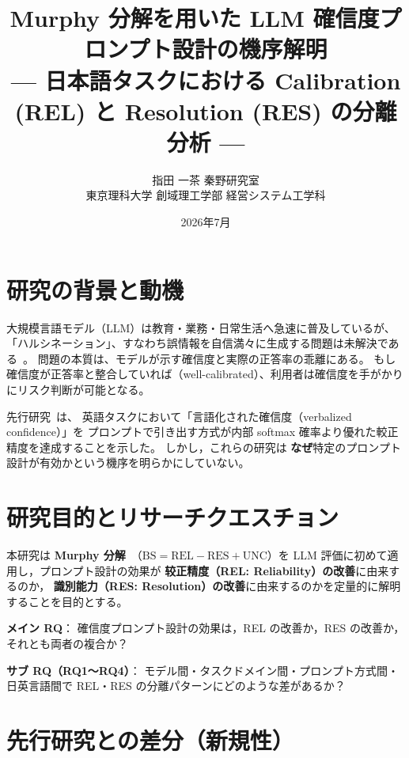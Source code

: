 \documentclass[10pt,a4paper,twocolumn]{article}
\title{\large\bfseries Murphy 分解を用いた LLM 確信度プロンプト設計の機序解明\\
{\normalsize --- 日本語タスクにおける Calibration (REL) と Resolution (RES) の分離分析 ---}}
\author{指田 一茶 \quad 秦野研究室\\
\small 東京理科大学 創域理工学部 経営システム工学科}
\date{\small 2026年7月}
\begin{document}
\maketitle
\thispagestyle{empty}

\section{研究の背景と動機}

大規模言語モデル（LLM）は教育・業務・日常生活へ急速に普及しているが、
「ハルシネーション」、すなわち誤情報を自信満々に生成する問題は未解決である~\cite{ji2023survey}。
問題の本質は、モデルが示す確信度と実際の正答率の乖離にある。
もし確信度が正答率と整合していれば（well-calibrated）、利用者は確信度を手がかりにリスク判断が可能となる。

先行研究~\cite{tian2023just,xiong2024can}は、
英語タスクにおいて「言語化された確信度（verbalized confidence）」を
プロンプトで引き出す方式が内部 softmax 確率より優れた較正精度を達成することを示した。
しかし，これらの研究は \textbf{なぜ}特定のプロンプト設計が有効かという機序を明らかにしていない。

\section{研究目的とリサーチクエスチョン}

本研究は \textbf{Murphy 分解}~\cite{murphy1973vector}（$\text{BS} = \text{REL} - \text{RES} + \text{UNC}$）を
LLM 評価に初めて適用し，プロンプト設計の効果が
\textbf{较正精度（REL: Reliability）の改善}に由来するのか，
\textbf{識別能力（RES: Resolution）の改善}に由来するのかを定量的に解明することを目的とする。

\textbf{メイン RQ}：
確信度プロンプト設計の効果は，REL の改善か，RES の改善か，それとも両者の複合か？

\textbf{サブ RQ（RQ1〜RQ4）}：
モデル間・タスクドメイン間・プロンプト方式間・日英言語間で
REL・RES の分離パターンにどのような差があるか？

\section{先行研究との差分（新規性）}
\end{document}
